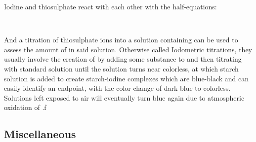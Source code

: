 \documentclass[../main]{subfiles}
\begin{document}
	Iodine and thiosulphate react with each other with the half-equations:

	\begin{center}
		 \\
	\end{center} 

	And a titration of thiosulphate ions into a solution containing  can be used to assess the amount of  in said solution. Otherwise called Iodometric titrations, they usually involve the creation of  by adding some substance to  and then titrating with standard  solution until the solution turns near colorless, at which starch solution is added to create starch-iodine complexes which are blue-black and can easily identify an endpoint, with the color change of dark blue to colorless. Solutions left exposed to air will eventually turn blue again due to atmospheric oxidation of .f

	\subsection{Miscellaneous}

\end{document}
